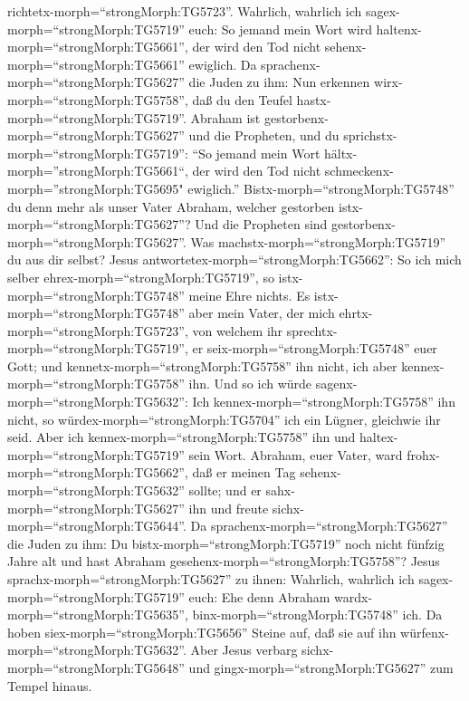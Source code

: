 richtetx-morph=``strongMorph:TG5723''.  Wahrlich, wahrlich
ich sagex-morph=``strongMorph:TG5719'' euch: So jemand mein Wort wird
haltenx-morph=``strongMorph:TG5661'', der wird den Tod nicht
sehenx-morph=``strongMorph:TG5661'' ewiglich.  Da
sprachenx-morph=``strongMorph:TG5627'' die Juden zu ihm: Nun erkennen
wirx-morph=``strongMorph:TG5758'', daß du den Teufel
hastx-morph=``strongMorph:TG5719''. Abraham ist
gestorbenx-morph=``strongMorph:TG5627'' und die Propheten, und du
sprichstx-morph=``strongMorph:TG5719'': ``So jemand mein Wort
hältx-morph=''strongMorph:TG5661``, der wird den Tod nicht
schmeckenx-morph=''strongMorph:TG5695" ewiglich.'' 
Bistx-morph=``strongMorph:TG5748'' du denn mehr als unser Vater Abraham,
welcher gestorben istx-morph=``strongMorph:TG5627''? Und die Propheten
sind gestorbenx-morph=``strongMorph:TG5627''. Was
machstx-morph=``strongMorph:TG5719'' du aus dir selbst? 
Jesus antwortetex-morph=``strongMorph:TG5662'': So ich mich selber
ehrex-morph=``strongMorph:TG5719'', so istx-morph=``strongMorph:TG5748''
meine Ehre nichts. Es istx-morph=``strongMorph:TG5748'' aber mein Vater,
der mich ehrtx-morph=``strongMorph:TG5723'', von welchem ihr
sprechtx-morph=``strongMorph:TG5719'', er
seix-morph=``strongMorph:TG5748'' euer Gott;  und
kennetx-morph=``strongMorph:TG5758'' ihn nicht, ich aber
kennex-morph=``strongMorph:TG5758'' ihn. Und so ich würde
sagenx-morph=``strongMorph:TG5632'': Ich
kennex-morph=``strongMorph:TG5758'' ihn nicht, so
würdex-morph=``strongMorph:TG5704'' ich ein Lügner, gleichwie ihr seid.
Aber ich kennex-morph=``strongMorph:TG5758'' ihn und
haltex-morph=``strongMorph:TG5719'' sein Wort.  Abraham,
euer Vater, ward frohx-morph=``strongMorph:TG5662'', daß er meinen Tag
sehenx-morph=``strongMorph:TG5632'' sollte; und er
sahx-morph=``strongMorph:TG5627'' ihn und freute
sichx-morph=``strongMorph:TG5644''.  Da
sprachenx-morph=``strongMorph:TG5627'' die Juden zu ihm: Du
bistx-morph=``strongMorph:TG5719'' noch nicht fünfzig Jahre alt und hast
Abraham gesehenx-morph=``strongMorph:TG5758''?  Jesus
sprachx-morph=``strongMorph:TG5627'' zu ihnen: Wahrlich, wahrlich ich
sagex-morph=``strongMorph:TG5719'' euch: Ehe denn Abraham
wardx-morph=``strongMorph:TG5635'', binx-morph=``strongMorph:TG5748''
ich.  Da hoben siex-morph=``strongMorph:TG5656'' Steine
auf, daß sie auf ihn würfenx-morph=``strongMorph:TG5632''. Aber Jesus
verbarg sichx-morph=``strongMorph:TG5648'' und
gingx-morph=``strongMorph:TG5627'' zum Tempel hinaus.

